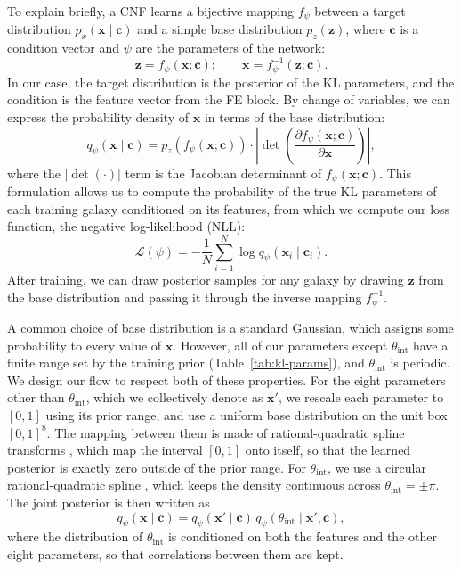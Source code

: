 To explain briefly, a CNF learns a bijective mapping $f_\psi$ between a target distribution $p_x(\mathbf{x \mid c})$ and a simple base distribution $p_z(\mathbf{z})$, where $\mathbf{c}$ is a condition vector and $\psi$ are the parameters of the network:
\begin{equation}
\label{eqn:cnf-transform}
    \mathbf{z} = f_\psi(\mathbf{x}; \mathbf{c}); \qquad \mathbf{x} = f_\psi^{-1}(\mathbf{z}; \mathbf{c}).
\end{equation}
In our case, the target distribution is the posterior of the KL parameters, and the condition is the feature vector from the FE block. By change of variables, we can express the probability density of $\mathbf{x}$ in terms of the base distribution:
\begin{equation}
\label{eqn:cnf-cv}
    q_\psi(\mathbf{x \mid c}) = p_z\left(f_\psi(\mathbf{x}; \mathbf{c})\right) \cdot \left| \det\left(\frac{\partial f_\psi(\mathbf{x}; \mathbf{c})}{\partial\mathbf{x}}\right)\right| ,
\end{equation}
where the $ |\det(\cdot)| $ term is the Jacobian determinant of $f_\psi(\mathbf{x}; \mathbf{c})$. This formulation allows us to compute the probability of the true KL parameters of each training galaxy conditioned on its features, from which we compute our loss function, the negative log-likelihood (NLL):
\begin{equation}
\label{eqn:loss-unweighted}
    \mathcal{L}(\psi) = -\frac{1}{N}\sum_{i=1}^N\log q_\psi(\mathbf{x}_i \mid \mathbf{c}_i).
\end{equation}
After training, we can draw posterior samples for any galaxy by drawing $\mathbf{z}$ from the base distribution and passing it through the inverse mapping $f_\psi^{-1}$.

A common choice of base distribution is a standard Gaussian, which assigns some probability to every value of $\mathbf{x}$. However, all of our parameters except $\theta_\mathrm{int}$ have a finite range set by the training prior (Table~\ref{tab:kl-params}), and $\theta_\mathrm{int}$ is periodic. We design our flow to respect both of these properties. For the eight parameters other than $\theta_\mathrm{int}$, which we collectively denote as $\mathbf{x}'$, we rescale each parameter to $[0, 1]$ using its prior range, and use a uniform base distribution on the unit box $[0, 1]^8$. The mapping between them is made of rational-quadratic spline transforms \citep{NeuralSplineFlows}, which map the interval $[0,1]$ onto itself, so that the learned posterior is exactly zero outside of the prior range. For $\theta_\mathrm{int}$, we use a circular rational-quadratic spline \citep{FlowsToriSpheres}, which keeps the density continuous across $\theta_\mathrm{int}=\pm\pi$. The joint posterior is then written as
\begin{equation}
\label{eqn:flow-factorization}
    q_\psi(\mathbf{x} \mid \mathbf{c}) = q_\psi(\mathbf{x}' \mid \mathbf{c})\, q_\psi(\theta_\mathrm{int} \mid \mathbf{x}', \mathbf{c}),
\end{equation}
where the distribution of $\theta_\mathrm{int}$ is conditioned on both the features and the other eight parameters, so that correlations between them are kept.

